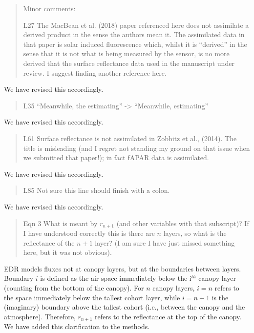 
\begin{quote}
Minor comments:

L27 The MacBean et al. (2018) paper referenced here does not assimilate a derived product in the sense the authors mean it. The assimilated data in that paper is solar induced fluorescence which, whilst it is “derived” in the sense that it is not what is being measured by the sensor, is no more derived that the surface reflectance data used in the manuscript under review. I suggest finding another reference here.
\end{quote}

We have revised this accordingly.

\begin{quote}
L35 “Meanwhile, the estimating” -> “Meanwhile, estimating”
\end{quote}

We have revised this accordingly.

\begin{quote}
L61 Surface reflectance is not assimilated in Zobbitz et al., (2014). The title is misleading (and I regret not standing my ground on that issue when we submitted that paper!); in fact fAPAR data is assimilated.
\end{quote}

We have revised this accordingly.

\begin{quote}
L85 Not sure this line should finish with a colon.
\end{quote}

We have revised this accordingly.

\begin{quote}
Eqn 3 What is meant by $r_{n+1}$ (and other variables with that subscript)? If I have understood correctly this is there are $n$ layers, so what is the reflectance of the $n + 1$ layer? (I am sure I have just missed something here, but it was not obvious).
\end{quote}

EDR models fluxes not at canopy layers, but at the boundaries between layers. Boundary $i$ is defined as the air space immediately below the i$^{th}$ canopy layer (counting from the bottom of the canopy). For $n$ canopy layers, $i = n$ refers to the space immediately below the tallest cohort layer, while $i = n+1$ is the (imaginary) boundary above the tallest cohort (i.e., between the canopy and the atmosphere). Therefore, $r_{n+1}$ refers to the reflectance at the top of the canopy. We have added this clarification to the methods.

